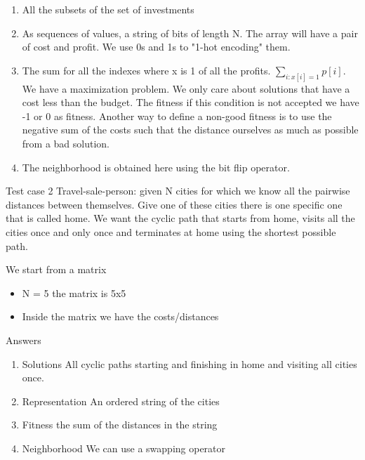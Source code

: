 \begin{enumerate}
    \item All the subsets of the set of investments
    \item As sequences of values, a string of bits of length N. The array will have a pair of  cost and profit. We use 0s and 1s to "1-hot encoding" them. 
    \item The sum for all the indexes where x is 1 of all the profits. $\sum\limits_{i:x[i]=1} p[i]$. We have a maximization problem. We only care about solutions that have a cost less than the budget. The fitness if this condition is not accepted we have -1 or 0 as fitness. Another way to define a non-good fitness is to use the negative sum of the costs such that the distance ourselves as much as possible from a bad solution. 
    \item The neighborhood is obtained here using the bit flip operator. 
\end{enumerate}


\vspace{10pt}

Test case 2 \ra Travel-sale-person: given N cities for which we know all the pairwise distances between themselves. Give one of these cities there is one specific one that is called home. We want the cyclic path that starts from home, visits all the cities once and only once and terminates at home using the shortest possible path.

\vspace{10pt}

We start from a matrix 

\begin{itemize}
    \item N = 5 \ra the matrix is 5x5
    \item Inside the matrix we have the costs/distances
\end{itemize}

Answers 

\begin{enumerate}
    \item Solutions \ra All cyclic paths starting and finishing in home and visiting all cities once. 
    \item Representation \ra An ordered string of the cities
    \item Fitness \ra the sum of the distances in the string
    \item Neighborhood \ra We can use a swapping operator
\end{enumerate}




